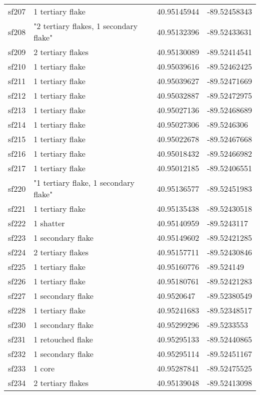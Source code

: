 \begin{longtable}{p{1cm}p{6cm}ll}
	sf207 & 1 tertiary flake & 40.95145944 & -89.52458343\\
	sf208 & "2 tertiary flakes, 1 secondary flake" & 40.95132396 & -89.52433631\\
	sf209 & 2 tertiary flakes & 40.95130089 & -89.52414541\\
	sf210 & 1 tertiary flake & 40.95039616 & -89.52462425\\
	sf211 & 1 tertiary flake & 40.95039627 & -89.52471669\\
	sf212 & 1 tertiary flake & 40.95032887 & -89.52472975\\
	sf213 & 1 tertiary flake & 40.95027136 & -89.52468689\\
	sf214 & 1 tertiary flake & 40.95027306 & -89.5246306\\
	sf215 & 1 tertiary flake & 40.95022678 & -89.52467668\\
	sf216 & 1 tertiary flake & 40.95018432 & -89.52466982\\
	sf217 & 1 tertiary flake & 40.95012185 & -89.52406551\\

	sf220 & "1 tertiary flake, 1 secondary flake" & 40.95136577 & -89.52451983\\
	sf221 & 1 tertiary flake & 40.95135438 & -89.52430518\\
	sf222 & 1 shatter & 40.95140959 & -89.5243117\\
	sf223 & 1 secondary flake & 40.95149602 & -89.52421285\\
	sf224 & 2 tertiary flakes & 40.95157711 & -89.52430846\\
	sf225 & 1 tertiary flake & 40.95160776 & -89.524149\\
	sf226 & 1 tertiary flake & 40.95180761 & -89.52421283\\
	sf227 & 1 secondary flake & 40.9520647 & -89.52380549\\
	sf228 & 1 tertiary flake & 40.95241683 & -89.52348517\\

	sf230 & 1 secondary flake & 40.95299296 & -89.5233553\\
	sf231 & 1 retouched flake & 40.95295133 & -89.52440865\\
	sf232 & 1 secondary flake & 40.95295114 & -89.52451167\\
	sf233 & 1 core & 40.95287841 & -89.52475525\\
	sf234 & 2 tertiary flakes & 40.95139048 & -89.52413098\\


\end{longtable}
